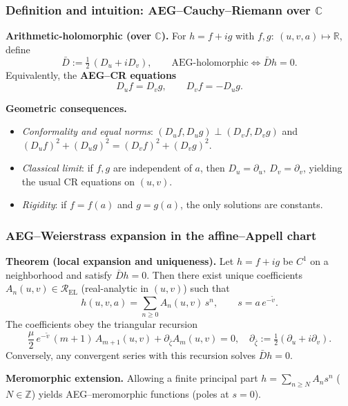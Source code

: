 \documentclass[aspectratio=169]{beamer}
\begin{document}
\begin{frame}
  \frametitle{Definition and intuition: AEG--Cauchy--Riemann over $\mathbb C$}
  \textbf{Arithmetic-holomorphic (over $\mathbb C$).} For $h=f+ig$ with $f,g:\ (u,v,a)\mapsto\mathbb R$,
  define
  \[
    \bar{D}:=\tfrac12\,(D_u+iD_v),\qquad \text{AEG-holomorphic} \iff \bar{D}h=0.
  \]
  Equivalently, the \textbf{AEG--CR equations}
  \[
    D_u f=D_v g,\qquad D_v f=-D_u g. \tag{16}
  \]

  \textbf{Geometric consequences.}
  \begin{itemize}
    \item \emph{Conformality and equal norms}:
      $(D_uf,D_ug)\perp(D_vf,D_vg)$ and
      $(D_uf)^2+(D_ug)^2=(D_vf)^2+(D_vg)^2$.
    \item \emph{Classical limit}: if $f,g$ are independent of $a$, then
      $D_u=\partial_u,\ D_v=\partial_v$, yielding the usual CR equations on $(u,v)$.
    \item \emph{Rigidity}: if $f=f(a)$ and $g=g(a)$, the only solutions are constants.
  \end{itemize}
\end{frame}

\begin{frame}
  \frametitle{AEG--Weierstrass expansion in the affine--Appell chart}
  \textbf{Theorem (local expansion and uniqueness).}
  Let $h=f+ig$ be $C^1$ on a neighborhood and satisfy $\bar{D}h=0$.
  Then there exist unique coefficients $A_n(u,v)\in\mathcal R_{\mathrm{EL}}$ (real-analytic in $(u,v)$)
  such that
  \[
    h(u,v,a)=\sum_{n\ge0} A_n(u,v)\,s^n,\qquad s=a\,e^{-\tilde v}.
  \]
  The coefficients obey the triangular recursion
  \[
    \frac{\mu}{2}\,e^{-\tilde v}\,(m+1)\,A_{m+1}(u,v)+\partial_{\bar\zeta}A_m(u,v)=0,
    \quad \partial_{\bar\zeta}:=\tfrac12(\partial_u+i\partial_v).
  \]
  Conversely, any convergent series with this recursion solves $\bar{D}h=0$.

  \textbf{Meromorphic extension.} Allowing a finite principal part
  $h=\sum_{n\ge N}A_n s^n$ ($N\in\mathbb Z$) yields AEG–meromorphic functions
  (poles at $s=0$).
\end{frame}
\end{document}
